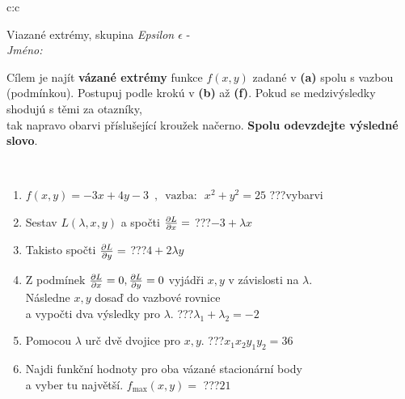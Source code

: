 \documentclass[10pt]{report}
\begin{document}
\begin{tabular}{c:c}
\begin{minipage}[c][104.5mm][t]{0.5\linewidth}
\begin{center}
\vspace{7mm}
{\huge Viazané extrémy, skupina \textit{Epsilon $\epsilon$} -}\\[5mm]
\textit{Jméno:}\phantom{xxxxxxxxxxxxxxxxxxxxxxxxxxxxxxxxxxxxxxxxxxxxxxxxxxxxxxxxxxxxxxxxx}\\[5mm]
\begin{minipage}{0.95\linewidth}
\begin{center}
Cílem je najít \textbf{vázané extrémy} funkce $f(x,y)$ zadané v \textbf{(a)} spolu s vazbou (podmínkou). Postupuj podle krokú v \textbf{(b)} až \textbf{(f)}. Pokud se medzivýsledky shodujú s těmi za otazníky,\\tak napravo obarvi příslušející kroužek načerno. \textbf{Spolu odevzdejte výsledné slovo}.
\end{center}
\end{minipage}
\\[1mm]
\begin{minipage}{0.79\linewidth}
\begin{center}
\begin{varwidth}{\linewidth}
\begin{enumerate}
\normalsize
\item $f(x,y)=-3x+4y-3 \enspace , \enspace \mathrm{vazba:} \enspace x^2+y^2=25$\quad \dotfill\; ???\;\dotfill \quad vybarvi
\item Sestav $L(\lambda,x,y)$ a spočti $\pdv{L}{x}=$\quad \dotfill\; ???\;\dotfill \quad $-3+\lambda x$
\item Takisto spočti $\pdv{L}{y}=$\quad \dotfill\; ???\;\dotfill \quad $4+2\lambda y$
\item Z podmínek $\pdv{L}{x}=0 , \pdv{L}{y}=0$ vyjádři $x,y$ v závislosti na $\lambda$.\\ \phantom{xxxxxx}Následne $x,y$ dosaď do vazbové rovnice\\ \phantom{xxxxxx}a vypočti dva výsledky pro $\lambda$.\quad \dotfill\; ???\;\dotfill \quad $\lambda_1+\lambda_2=-2$
\item Pomocou $\lambda$ urč dvě dvojice pro $x,y$.\quad \dotfill\; ???\;\dotfill \quad $x_1 x_2 y_1 y_2=36$
\item Najdi funkční hodnoty pro oba vázané stacionární body\\ \phantom{xxxxxx}a vyber tu najvětší. $f_{\text{max}}(x,y)=$\quad \dotfill\; ???\;\dotfill \quad $21$

\end{enumerate}
\end{varwidth}
\end{center}
\end{minipage}
\end{center}
\end{minipage}
\end{tabular}
\end{document}

